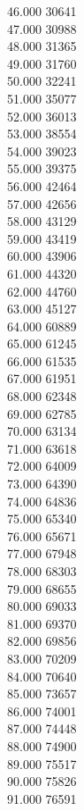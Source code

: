{ 46.000	30641 \\
 47.000	30988 \\
 48.000	31365 \\
 49.000	31760 \\
 50.000	32241 \\
 51.000	35077 \\
 52.000	36013 \\
 53.000	38554 \\
 54.000	39023 \\
 55.000	39375 \\
 56.000	42464 \\
 57.000	42656 \\
 58.000	43129 \\
 59.000	43419 \\
 60.000	43906 \\
 61.000	44320 \\
 62.000	44760 \\
 63.000	45127 \\
 64.000	60889 \\
 65.000	61245 \\
 66.000	61535 \\
 67.000	61951 \\
 68.000	62348 \\
 69.000	62785 \\
 70.000	63134 \\
 71.000	63618 \\
 72.000	64009 \\
 73.000	64390 \\
 74.000	64836 \\
 75.000	65340 \\
 76.000	65671 \\
 77.000	67948 \\
 78.000	68303 \\
 79.000	68655 \\
 80.000	69033 \\
 81.000	69370 \\
 82.000	69856 \\
 83.000	70209 \\
 84.000	70640 \\
 85.000	73657 \\
 86.000	74001 \\
 87.000	74448 \\
 88.000	74900 \\
 89.000	75517 \\
 90.000	75826 \\
 91.000	76591 \\
}
